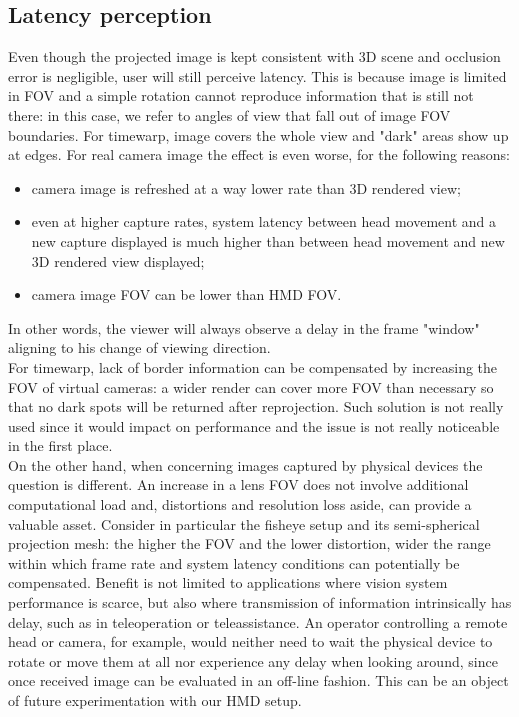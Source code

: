\subsection{Latency perception}
Even though the projected image is kept consistent with 3D scene and occlusion error is negligible, user will still perceive latency. This is because image is limited in FOV and a simple rotation cannot reproduce information that is still not there: in this case, we refer to angles of view that fall out of image FOV boundaries. For timewarp, image covers the whole view and "dark" areas show up at edges. For real camera image the effect is even worse, for the following reasons:
\begin{itemize}
\item camera image is refreshed at a way lower rate than 3D rendered view;
\item even at higher capture rates, system latency between head movement and a new capture displayed is much higher than between head movement and new 3D rendered view displayed;
\item camera image FOV can be lower than HMD FOV.
\end{itemize}
In other words, the viewer will always observe a delay in the frame "window" aligning to his change of viewing direction.\\
For timewarp, lack of border information can be compensated by increasing the FOV of virtual cameras: a wider render can cover more FOV than necessary so that no dark spots will be returned after reprojection. Such solution is not really used since it would impact on performance and the issue is not really noticeable in the first place.\\
On the other hand, when concerning images captured by physical devices the question is different. An increase in a lens FOV does not involve additional computational load and, distortions and resolution loss aside, can provide a valuable asset. Consider in particular the fisheye setup and its semi-spherical projection mesh: the higher the FOV and the lower distortion, wider the range within which frame rate and system latency conditions can potentially be compensated. Benefit is not limited to applications where vision system performance is scarce, but also where transmission of information intrinsically has delay, such as in teleoperation or teleassistance. An operator controlling a remote head or camera, for example, would neither need to wait the physical device to rotate or move them at all nor experience any delay when looking around, since once received image can be evaluated in an off-line fashion. This can be an object of future experimentation with our HMD setup.\\
